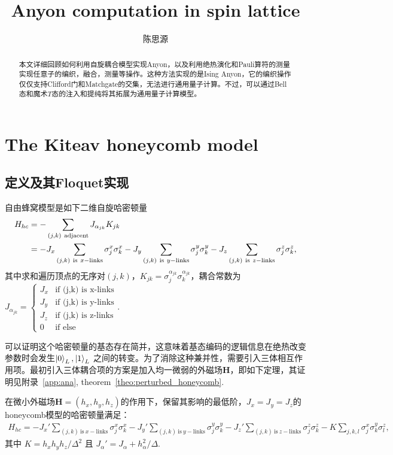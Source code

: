 \documentclass[12pt,letterpaper]{article}
\title{Anyon computation in spin lattice}
\begin{document}
\author{陈思源}
\maketitle
\begin{abstract}
    本文详细回顾如何利用自旋耦合模型实现Anyon，以及利用绝热演化和Pauli算符的测量实现任意子的编织，融合，测量等操作。这种方法实现的是Ising Anyon，它的编织操作仅仅支持Clifford门和Matchgate的交集，无法进行通用量子计算。不过，可以通过Bell态和魔术$T$态的注入和提纯将其拓展为通用量子计算模型。
\end{abstract}

\section{The Kiteav honeycomb model}
\subsection{定义及其Floquet实现}
\begin{definition}
    自由蜂窝模型是如下二维自旋哈密顿量
    \begin{align}H_{hc}&=-\sum_{(j,k) \mathrm{~adjacent}} J_{\alpha_{jk}} K_{jk}\notag\\&=-J_x\sum_{(j,k)\mathrm{~is~}x-\mathrm{links}}\sigma_j^x\sigma_k^x-J_y\sum_{(j,k)\mathrm{~is~}y-\mathrm{links}}\sigma_j^y\sigma_k^y-J_z\sum_{(j,k)\mathrm{~is~}z-\mathrm{links}}\sigma_j^z\sigma_k^z,\end{align}
    其中求和遍历顶点的无序对$(j,k)$，$K_{jk} = \sigma_{j}^{\alpha_{jk}}\sigma_{k}^{\alpha_{jk}}$，耦合常数为$J_{\alpha_{jk}} = \begin{cases}J_x &\text{if (j,k) is x-links}\\J_y &\text{if (j,k) is y-links}\\J_z &\text{if (j,k) is z-links}\\0 &\text{if else}\end{cases}$.
\end{definition}
可以证明这个哈密顿量的基态存在简并，这意味着基态编码的逻辑信息在绝热改变参数时会发生$\ket{0}_L, \ket{1}_L$ 之间的转变。为了消除这种兼并性，需要引入三体相互作用项。最初引入三体耦合项的方案是加入均一微弱的外磁场$\mathbf{H}$，即如下定理，其证明见附录~\ref{app:ana}, theorem~\ref{theo:perturbed_honeycomb}.
\begin{theorem}
    在微小外磁场$\mathbf{H} =(h_x, h_y,h_z)$的作用下，保留其影响的最低阶，$J_x= J_y = J_z$的honeycomb模型的哈密顿量满足：   \begin{align}H_{hc}=-J_x'\sum_{(j,k)\mathrm{~is~}x-\mathrm{links}}\sigma_j^x\sigma_k^x-J_y'\sum_{(j,k)\mathrm{~is~}y-\mathrm{links}}\sigma_j^y\sigma_k^y-J_z'\sum_{(j,k)\mathrm{~is~}z-\mathrm{links}}\sigma_j^z\sigma_k^z - K\sum_{j,k,l}\sigma_j^x \sigma_k^y \sigma_l^z,\end{align}
    其中 $K = {h_xh_yh_z}/{\Delta^2}$ 且 $J_{\alpha}' = J_{\alpha} + h_{\alpha}^2/\Delta$.
\end{theorem}
\end{document}
